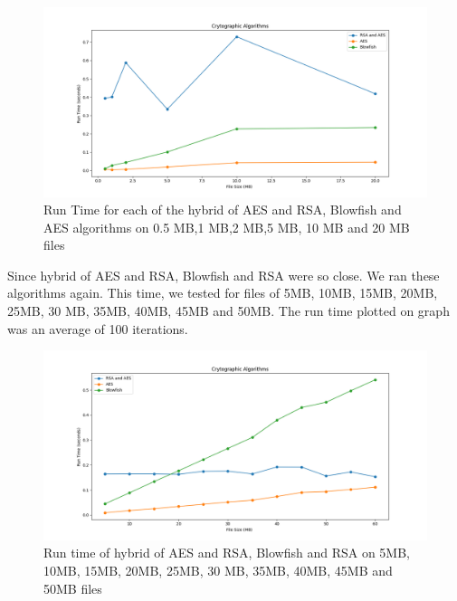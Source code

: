 \documentclass[a4paper]{report} %
\begin{document}
\begin{figure}
\centering
\includegraphics[width=1\textwidth]{images/Final1.png}
\caption{Run Time for each of the hybrid of AES and RSA, Blowfish and AES algorithms on 0.5 MB,1 MB,2 MB,5 MB, 10 MB and 20 MB files}
\end{figure}
    


Since hybrid of AES and RSA, Blowfish and RSA were so close. We ran these algorithms again. This time, we tested for files of 5MB, 10MB, 15MB, 20MB, 25MB, 30 MB, 35MB, 40MB, 45MB and 50MB. The run time plotted on graph was an average of 100 iterations. 


\begin{figure}
\centering
\includegraphics[width=1\textwidth]{images/three.png}
\caption{Run time of hybrid of AES and RSA, Blowfish and RSA on 5MB, 10MB, 15MB, 20MB, 25MB, 30 MB, 35MB, 40MB, 45MB and 50MB files}
\end{figure}

\clearpage
\end{document}
